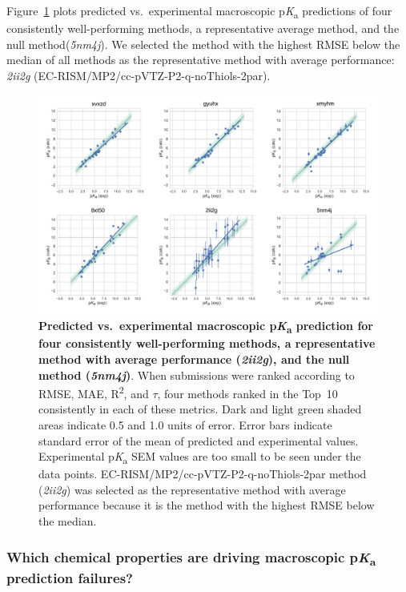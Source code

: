 \documentclass[9pt,lineno,final]{elife}
\newcommand{\pKa}{p\textit{K}\textsubscript{a}}
\begin{document}
Figure~\ref{fig:typeIII_pred_vs_exp_correlation} plots predicted vs.\ experimental macroscopic \pKa{} predictions of four consistently well-performing methods, a representative average method, and the null method(\textit{5nm4j}). 
We selected the method with the highest RMSE below the median of all methods as the representative method with average performance: \textit{2ii2g} (EC-RISM/MP2/cc-pVTZ-P2-q-noThiols-2par).

\begin{figure}[h]
\centering
\includegraphics[width=1.0\linewidth]{figures/typeIII-pred-vs-exp-correlation-fig.pdf}
\caption{{\bf Predicted vs.\ experimental macroscopic \pKa{} prediction for four consistently well-performing methods, a representative method with average performance (\textit{2ii2g}), and the null method (\textit{5nm4j})}. 
When submissions were ranked according to RMSE, MAE, R\textsuperscript{2}, and $\tau$, four methods ranked in the Top~10 consistently in each of these metrics.
Dark and light green shaded areas indicate 0.5 and 1.0 units of error. Error bars indicate standard error of the mean of predicted and experimental values. Experimental \pKa{} SEM values are too small to be seen under the data points. EC-RISM/MP2/cc-pVTZ-P2-q-noThiols-2par method (\textit{2ii2g}) was selected as the representative method with average performance because it is the method with the highest RMSE below the median.
}
\label{fig:typeIII_pred_vs_exp_correlation}
\end{figure}



\subsubsection{Which chemical properties are driving macroscopic \pKa{} prediction failures?}
\end{document}
